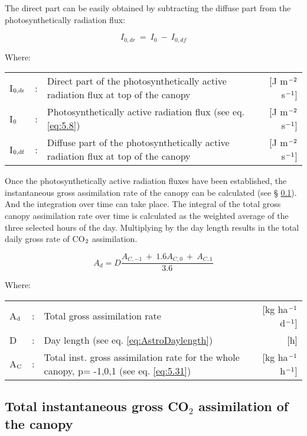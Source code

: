 The direct part can be easily obtained by subtracting the diffuse part from the
photosynthetically radiation flux:

\begin{equation}
I_{0,dr} ~=~ I_{0} ~-~I_{0,df} 
\end{equation}
 
Where:\\[5pt]
\begin{tabularx}{\textwidth}{llXr}
I$_{{\rm 0,dr}}$ &:& Direct part of the photosynthetically active radiation flux 
   at top of the canopy    &    [J m$^{{\rm -2}}$ s$^{{\rm -1}}$]\\
I$_{{\rm 0}}$ &:& Photosynthetically active radiation flux (see eq. \ref{eq:5.8})    &  
   [J m$^{{\rm -2}}$ s$^{{\rm -1}}$]\\
I$_{{\rm 0,df}}$ &:& Diffuse part of the photosynthetically active radiation flux 
   at top of the canopy     &   [J m$^{{\rm -2}}$ s$^{{\rm -1}}$]\\
\end{tabularx}

Once the photosynthetically active radiation fluxes have been established, the 
instantaneous gross assimilation rate of the canopy can be calculated (see \S
 \ref{sec:InstantGrossAssimilation}). And the integration over time can take place.
The integral of the total gross canopy assimilation rate over time is calculated as the
weighted average of the three selected hours of the day. Multiplying by the day length
results in the total daily gross rate of CO$_{{\rm 2}}$ assimilation. 

\begin{equation}
\label{eq:5.11}
A_{d} = D {\frac{A_{C,-1} ~+~ 1.6 A_{C,0} ~+~ A_{C,1} }{3.6}}
\end{equation}

Where:\\[5pt]
\begin{tabularx}{\textwidth}{llXr}
A$_{{\rm d}}$ &:& Total gross assimilation rate    &    
[kg ha$^{{\rm -1}}$ d$^{{\rm -1}}$]\\
D &:& Day length (see eq. \ref{eq:AstroDaylength})   &     [h]\\
A$_{{\rm C}}$ &:& Total inst. gross assimilation rate for
   the whole canopy, p= -1,0,1 (see eq. \ref{eq:5.31})    &
   [kg ha$^{{\rm -1}}$ h$^{{\rm -1}}$]\\
\end{tabularx}

\subsection{Total instantaneous gross CO$_{2}$ assimilation of the canopy}  
\label{sec:InstantGrossAssimilation}

